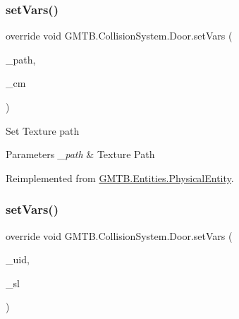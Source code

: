 \mbox{\label{class_g_m_t_b_1_1_collision_system_1_1_door_a45583194dab8dc4b35266644b94d3c40}} 
\subsubsection{\texorpdfstring{setVars()}{setVars()}\hspace{0.1cm}{\footnotesize\ttfamily [1/2]}}
{\footnotesize\ttfamily override void G\+M\+T\+B.\+Collision\+System.\+Door.\+set\+Vars (\begin{DoxyParamCaption}\item[{string}]{\+\_\+path,  }\item[{\mbox{\hyperlink{interface_g_m_t_b_1_1_interfaces_1_1_i_content___manager}{I\+Content\+\_\+\+Manager}}}]{\+\_\+cm }\end{DoxyParamCaption})\hspace{0.3cm}{\ttfamily [virtual]}}



Set Texture path 


\begin{DoxyParams}{Parameters}
{\em \+\_\+path} & Texture Path\\
\hline
\end{DoxyParams}


Reimplemented from \mbox{\hyperlink{class_g_m_t_b_1_1_entities_1_1_physical_entity_add277bab26367c3364210b3577f6d7cd}{G\+M\+T\+B.\+Entities.\+Physical\+Entity}}.

\mbox{\label{class_g_m_t_b_1_1_collision_system_1_1_door_a31faede8cd554e4cfea2a012a1c4928e}} 
\subsubsection{\texorpdfstring{setVars()}{setVars()}\hspace{0.1cm}{\footnotesize\ttfamily [2/2]}}
{\footnotesize\ttfamily override void G\+M\+T\+B.\+Collision\+System.\+Door.\+set\+Vars (\begin{DoxyParamCaption}\item[{int}]{\+\_\+uid,  }\item[{\mbox{\hyperlink{interface_g_m_t_b_1_1_interfaces_1_1_i_service_locator}{I\+Service\+Locator}}}]{\+\_\+sl }\end{DoxyParamCaption})\hspace{0.3cm}{\ttfamily [virtual]}}



